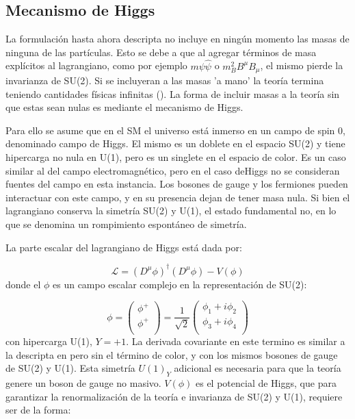 \subsection{Mecanismo de Higgs}

La formulación hasta ahora descripta no incluye en ningún momento las masas de ninguna de las partículas. Esto se debe a que al agregar términos de masa explícitos al lagrangiano, como por ejemplo $m\psi\hat{\psi}$ o $m_B^2 B^{\mu}B_{\mu}$, el mismo pierde la invarianza de SU(2). Si se incluyeran a las masas 'a mano' la teoría termina teniendo cantidades físicas infinitas (). La forma de incluir masas a la teoría sin que estas sean nulas es mediante el mecanismo de Higgs. 

 Para ello se asume que en el SM el universo está inmerso en un campo de spin 0, denominado campo de Higgs. El mismo es un doblete en el espacio SU(2) y tiene hipercarga no nula en U(1), pero es un singlete en el espacio de color. Es un caso similar al del campo electromagnético, pero en el caso deHiggs no se consideran fuentes del campo en esta instancia. Los bosones de gauge y los fermiones pueden interactuar con este campo, y en su presencia dejan de tener masa nula. Si bien el lagrangiano conserva la simetría SU(2) y U(1), el estado fundamental no, en lo que se denomina un rompimiento espontáneo de simetría.

La parte escalar del lagrangiano de Higgs está dada por:

\begin{equation}
\mathcal{L} = (D^{\mu}\phi)^{\dagger}(D^{\mu}\phi) - V(\phi)
\end{equation}
%
donde el $\phi$ es un campo escalar complejo en la representación de SU(2):

\begin{equation}
	\phi = 
	\begin{pmatrix}
	\phi^{+} \\
	\phi^{+} \\
	\end{pmatrix} = \frac{1}{\sqrt{2}}
	\begin{pmatrix}
	\phi_{1} + i\phi_{2} \\
	\phi_{3} + i\phi_{4} \\
	\end{pmatrix}
\end{equation}
%
con hipercarga U(1), $Y=+1$. La derivada covariante en este termino es similar a la descripta en pero sin el término de color, y con los mismos bosones de gauge de SU(2) y U(1). Esta simetría $U(1)_Y$ adicional es necesaria para que la teoría genere un boson de gauge no masivo.
$V(\phi)$ es el potencial de Higgs, que para garantizar la renormalización de la teoría e invarianza de SU(2) y U(1), requiere ser de la forma:

